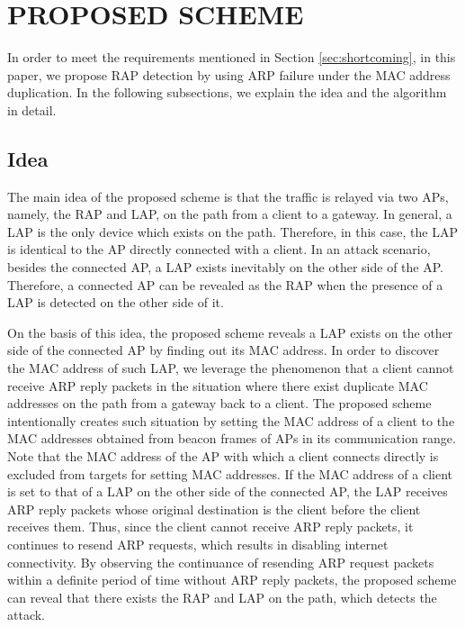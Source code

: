 \documentclass[conference]{IEEEtran}
\begin{document}
\section{PROPOSED SCHEME}\label{sec:4}
In order to meet the requirements mentioned in Section \ref{sec:shortcoming}, in this paper, we propose RAP detection by using ARP failure under the MAC address duplication.
In the following subsections, we explain the idea and the algorithm in detail.

\subsection{Idea}
The main idea of the proposed scheme is that the traffic is relayed via two APs, namely, the RAP and LAP, on the path from a client to a gateway.
In general, a LAP is the only device which exists on the path.
Therefore, in this case, the LAP is identical to the AP directly connected with a client.
In an attack scenario, besides the connected AP, a LAP exists inevitably on the other side of the AP.
Therefore, a connected AP can be revealed as the RAP when the presence of a LAP is detected on the other side of it.

On the basis of this idea, the proposed scheme reveals a LAP exists on the other side of the connected AP by finding out its MAC address.
In order to discover the MAC address of such LAP, we leverage the phenomenon that a client cannot receive ARP reply packets in the situation where there exist duplicate MAC addresses on the path from a gateway back to a client.
The proposed scheme intentionally creates such situation by setting the MAC address of a client to the MAC addresses obtained from beacon frames of APs in its communication range.
Note that the MAC address of the AP with which a client connects directly is excluded from targets for setting MAC addresses.
If the MAC address of a client is set to that of a LAP on the other side of the connected AP, the LAP receives ARP reply packets whose original destination is the client before the client receives them.
Thus, since the client cannot receive ARP reply packets, it continues to resend ARP requests, which results in disabling internet connectivity.
By observing the continuance of resending ARP request packets within a definite period of time without ARP reply packets, the proposed scheme can reveal that there exists the RAP and LAP on the path, which detects the attack. %
\end{document}

